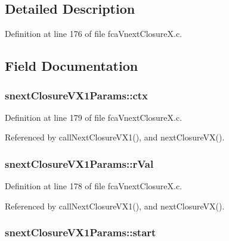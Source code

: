 \subsection{\-Detailed \-Description}


\-Definition at line 176 of file fca\-Vnext\-Closure\-X.\-c.



\subsection{\-Field \-Documentation}
\hypertarget{structsnextClosureVX1Params_af00ec23c26d8b4e217d29e5b949f285d}{
\subsubsection[{ctx}]{ {\bf snext\-Closure\-V\-X1\-Params\-::ctx}}}\label{structsnextClosureVX1Params_af00ec23c26d8b4e217d29e5b949f285d}


\-Definition at line 179 of file fca\-Vnext\-Closure\-X.\-c.



\-Referenced by call\-Next\-Closure\-V\-X1(), and next\-Closure\-V\-X().

\hypertarget{structsnextClosureVX1Params_a6cdec21a24ddae482ae521f8c560703a}{
\subsubsection[{r\-Val}]{ {\bf snext\-Closure\-V\-X1\-Params\-::r\-Val}}}\label{structsnextClosureVX1Params_a6cdec21a24ddae482ae521f8c560703a}


\-Definition at line 178 of file fca\-Vnext\-Closure\-X.\-c.



\-Referenced by call\-Next\-Closure\-V\-X1(), and next\-Closure\-V\-X().

\hypertarget{structsnextClosureVX1Params_a61ba68899ccb6dff43b95531868f5093}{
\subsubsection[{start}]{ {\bf snext\-Closure\-V\-X1\-Params\-::start}}}\label{structsnextClosureVX1Params_a61ba68899ccb6dff43b95531868f5093}


